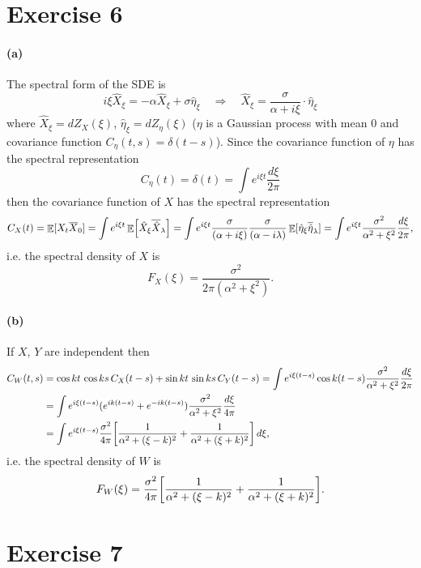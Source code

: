 \documentclass[a4paper,11pt]{article}
\theoremstyle{definition}
\theoremstyle{plain}
\theoremstyle{remark}
\DeclarePairedDelimiter{\parq}{[}{]}
\DeclareMathOperator*{\expval}{\mathbb{E}}
\begin{document}
\section*{Exercise 6}

\paragraph*{(a)}

The spectral form of the SDE is
$$
i\xi \hat{X}_\xi = -\alpha\hat{X}_\xi + \sigma\hat{\eta}_\xi \quad\Longrightarrow\quad \hat{X}_\xi = \frac{\sigma}{\alpha+i\xi}\cdot\hat{\eta}_\xi
$$
where $\hat{X}_\xi = dZ_X(\xi)$, $\hat{\eta}_\xi = dZ_\eta(\xi)$ ($\eta$ is a Gaussian process with mean $0$ and covariance function $C_\eta(t,s)=\delta(t-s)$).
Since the covariance function of $\eta$ has the spectral representation
$$
C_\eta(t) = \delta(t) = \int e^{i\xi t}\frac{d\xi}{2\pi}
$$
then the covariance function of $X$ has the spectral representation
$$
C_X(t) = \expval\parq{X_t\overline{X}_0} = \int e^{i\xi t}\expval\parq*{\hat{X}_\xi\overline{\hat{X}}_\lambda} = \int e^{i\xi t}\frac{\sigma}{(\alpha+i\xi)}\frac{\sigma}{(\alpha-i\lambda)}\expval[\hat{\eta}_\xi\overline{\hat{\eta}}_\lambda] = \int e^{i\xi t}\frac{\sigma^2}{\alpha^2+\xi^2}\frac{d\xi}{2\pi},
$$
i.e. the spectral density of $X$ is 
$$
F_X(\xi) = \frac{\sigma^2}{2\pi(\alpha^2+\xi^2)}.
$$

\paragraph*{(b)}

If $X$, $Y$ are independent then
\begin{align*}
C_{W}(t,s) & = \cos kt \, \cos ks \, C_X(t-s)  + \sin kt \, \sin ks \, C_Y(t-s) = \int e^{i\xi (t-s)}\cos k(t-s) \frac{\sigma^2}{\alpha^2+\xi^2}\frac{d\xi}{2\pi}
\\ & = \int e^{i\xi (t-s)}(e^{ik(t-s)}+e^{-ik(t-s)}) \frac{\sigma^2}{\alpha^2+\xi^2}\frac{d\xi}{4\pi} \\ & = \int e^{i\xi (t-s)} \frac{\sigma^2}{4\pi}\parq*{\frac{1}{\alpha^2+(\xi-k)^2}+\frac{1}{\alpha^2+(\xi+k)^2}}\,d\xi,
\end{align*}
i.e. the spectral density of $W$ is 
$$
F_W(\xi) = \frac{\sigma^2}{4\pi}\parq*{\frac{1}{\alpha^2+(\xi-k)^2}+\frac{1}{\alpha^2+(\xi+k)^2}}.
$$

\section*{Exercise 7}
\end{document}
